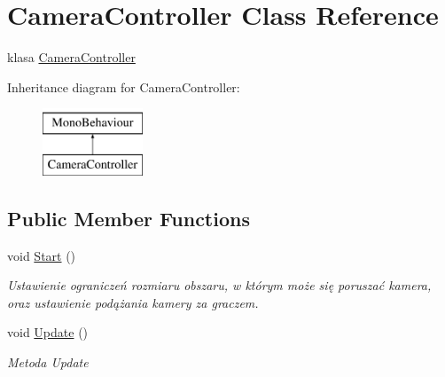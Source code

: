 \hypertarget{class_camera_controller}{}\section{Camera\+Controller Class Reference}
\label{class_camera_controller}


klasa \hyperlink{class_camera_controller}{Camera\+Controller}  


Inheritance diagram for Camera\+Controller\+:\begin{figure}[H]
\begin{center}
\leavevmode
\includegraphics[height=2.000000cm]{class_camera_controller}
\end{center}
\end{figure}
\subsection*{Public Member Functions}
\begin{DoxyCompactItemize}
\item 
void \hyperlink{class_camera_controller_ad4a238c6f7db3ee003302a245d860860}{Start} ()
\begin{DoxyCompactList}\small\item\em Ustawienie ograniczeń rozmiaru obszaru, w którym może się poruszać kamera, oraz ustawienie podążania kamery za graczem. \end{DoxyCompactList}\item 
void \hyperlink{class_camera_controller_a7c4f486f4bcbd1d54a346fdce9707bd5}{Update} ()
\begin{DoxyCompactList}\small\item\em Metoda Update \end{DoxyCompactList}\end{DoxyCompactItemize}
